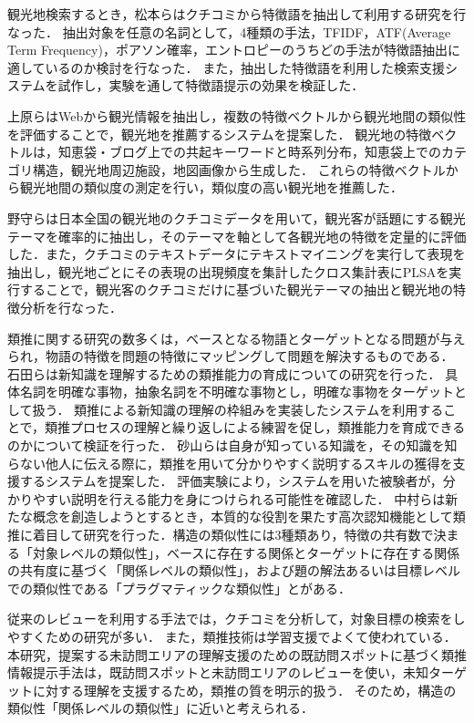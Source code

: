 \documentclass{deimj}
\begin{document}
観光地検索するとき，松本ら\cite{Codd02}はクチコミから特徴語を抽出して利用する研究を行なった．
抽出対象を任意の名詞として，4種類の手法，TFIDF，ATF(Average Term Frequency)，ポアソン確率，エントロピーのうちどの手法が特徴語抽出に適しているのか検討を行なった．
また，抽出した特徴語を利用した検索支援システムを試作し，実験を通して特徴語提示の効果を検証した．

上原ら\cite{Codd03}はWebから観光情報を抽出し，複数の特徴ベクトルから観光地間の類似性を評価することで，観光地を推薦するシステムを提案した．
観光地の特徴ベクトルは，知恵袋・ブログ上での共起キーワードと時系列分布，知恵袋上でのカテゴリ構造，観光地周辺施設，地図画像から生成した．
これらの特徴ベクトルから観光地間の類似度の測定を行い，類似度の高い観光地を推薦した．

野守ら\cite{Codd04}は日本全国の観光地のクチコミデータを用いて，観光客が話題にする観光テーマを確率的に抽出し，そのテーマを軸として各観光地の特徴を定量的に評価した．また，クチコミのテキストデータにテキストマイニングを実行して表現を抽出し，観光地ごとにその表現の出現頻度を集計したクロス集計表にPLSAを実行することで，観光客のクチコミだけに基づいた観光テーマの抽出と観光地の特徴分析を行なった．

類推に関する研究の数多くは，ベースとなる物語とターゲットとなる問題が与えられ，物語の特徴を問題の特徴にマッピングして問題を解決するものである\cite{Codd05}．
石田ら\cite{Codd06}は新知識を理解するための類推能力の育成についての研究を行った．
具体名詞を明確な事物，抽象名詞を不明確な事物とし，明確な事物をターゲットとして扱う．
類推による新知識の理解の枠組みを実装したシステムを利用することで，類推プロセスの理解と繰り返しによる練習を促し，類推能力を育成できるのかについて検証を行った．
砂山ら\cite{Codd07}は自身が知っている知識を，その知識を知らない他人に伝える際に，類推を用いて分かりやすく説明するスキルの獲得を支援するシステムを提案した．
評価実験により，システムを用いた被験者が，分かりやすい説明を行える能力を身につけられる可能性を確認した．
中村ら\cite{Codd08}は新たな概念を創造しようとするとき，本質的な役割を果たす高次認知機能として類推に着目して研究を行った．構造の類似性には3種類あり，特徴の共有数で決まる「対象レベルの類似性」，ベースに存在する関係とターゲットに存在する関係の共有度に基づく「関係レベルの類似性」，および題の解法あるいは目標レベルでの類似性である「プラグマティックな類似性」とがある\cite{Codd09}．

従来のレビューを利用する手法では，クチコミを分析して，対象目標の検索をしやすくための研究が多い．
また，類推技術は学習支援でよくて使われている．
本研究，提案する未訪問エリアの理解支援のための既訪問スポットに基づく類推情報提示手法は，既訪問スポットと未訪問エリアのレビューを使い，未知ターゲットに対する理解を支援するため，類推の質を明示的扱う．
そのため，構造の類似性「関係レベルの類似性」に近いと考えられる．
\end{document}
